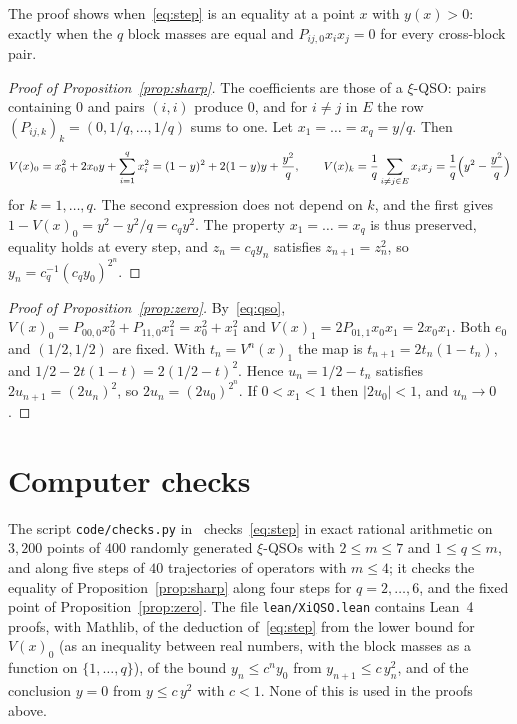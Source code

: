 \documentclass[11pt]{amsart}
\theoremstyle{definition}
\theoremstyle{remark}
\numberwithin{equation}{section}
\begin{document}
The proof shows when~\eqref{eq:step} is an equality at a point $x$ with $y(x)>0$: exactly when the $q$ block masses are equal and $P_{ij,0}x_ix_j=0$ for every cross-block pair.

\begin{proof}[Proof of Proposition~\ref{prop:sharp}]
The coefficients are those of a $\xi$-QSO: pairs containing $0$ and pairs $(i,i)$ produce $0$, and for $i\ne j$ in $E$ the row $(P_{ij,k})_k=(0,1/q,\dots,1/q)$ sums to one. Let $x_1=\dots=x_q=y/q$. Then
\[
V(x)_0=x_0^2+2x_0y+\sum_{i=1}^q x_i^2=(1-y)^2+2(1-y)y+\frac{y^2}{q},
\qquad
V(x)_k=\frac1q\sum_{i\neq j\in E}x_ix_j=\frac1q\Bigl(y^2-\frac{y^2}q\Bigr)
\]
for $k=1,\dots,q$. The second expression does not depend on $k$, and the first gives $1-V(x)_0=y^2-y^2/q=c_qy^2$. The property $x_1=\dots=x_q$ is thus preserved, equality holds at every step, and $z_n=c_qy_n$ satisfies $z_{n+1}=z_n^2$, so $y_n=c_q^{-1}(c_qy_0)^{2^n}$.
\end{proof}

\begin{proof}[Proof of Proposition~\ref{prop:zero}]
By~\eqref{eq:qso}, $V(x)_0=P_{00,0}x_0^2+P_{11,0}x_1^2=x_0^2+x_1^2$ and $V(x)_1=2P_{01,1}x_0x_1=2x_0x_1$. Both $e_0$ and $(1/2,1/2)$ are fixed. With $t_n=V^n(x)_1$ the map is $t_{n+1}=2t_n(1-t_n)$, and $1/2-2t(1-t)=2(1/2-t)^2$. Hence $u_n=1/2-t_n$ satisfies $2u_{n+1}=(2u_n)^2$, so $2u_n=(2u_0)^{2^n}$. If $0<x_1<1$ then $|2u_0|<1$, and $u_n\to0$.
\end{proof}

\section{Computer checks}

The script \texttt{code/checks.py} in~\cite{code} checks~\eqref{eq:step} in exact rational arithmetic on $3{,}200$ points of $400$ randomly generated $\xi$-QSOs with $2\le m\le7$ and $1\le q\le m$, and along five steps of $40$ trajectories of operators with $m\le4$; it checks the equality of Proposition~\ref{prop:sharp} along four steps for $q=2,\dots,6$, and the fixed point of Proposition~\ref{prop:zero}. The file \texttt{lean/XiQSO.lean} contains Lean~4 proofs, with Mathlib, of the deduction of~\eqref{eq:step} from the lower bound for $V(x)_0$ (as an inequality between real numbers, with the block masses as a function on $\{1,\dots,q\}$), of the bound $y_n\le c^ny_0$ from $y_{n+1}\le c\,y_n^2$, and of the conclusion $y=0$ from $y\le c\,y^2$ with $c<1$. None of this is used in the proofs above.
\end{document}
